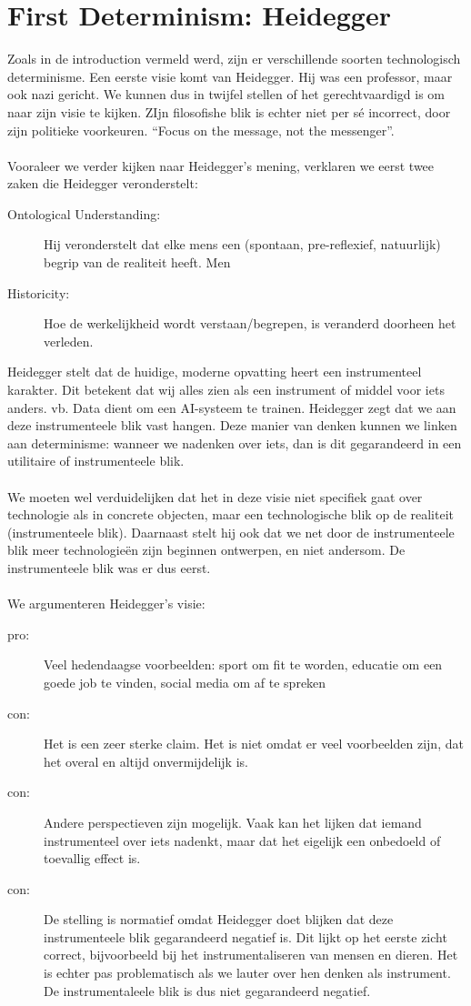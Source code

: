 \documentclass[../summary.tex]{subfiles}
\begin{document}
	\section{First Determinism: Heidegger}
	Zoals in de introduction vermeld werd, zijn er verschillende soorten technologisch determinisme. Een eerste visie komt van Heidegger. Hij was een professor, maar ook nazi gericht. We kunnen dus in twijfel stellen of het gerechtvaardigd is om naar zijn visie te kijken. ZIjn filosofishe blik is echter niet per sé incorrect, door zijn politieke voorkeuren. ``Focus on the message, not the messenger''. \\
	\\
	Vooraleer we verder kijken naar Heidegger's mening, verklaren we eerst twee zaken die Heidegger veronderstelt:
	\begin{description}
		\item[Ontological Understanding: ] Hij veronderstelt dat elke mens een (spontaan, pre-reflexief, natuurlijk) begrip van de realiteit heeft. Men
		\item[Historicity: ] Hoe de werkelijkheid wordt verstaan/begrepen, is veranderd doorheen het verleden.
	\end{description}
	Heidegger stelt dat de huidige, moderne opvatting heert een instrumenteel karakter. Dit betekent dat wij alles zien als een instrument of middel voor iets anders. vb. Data dient om een AI-systeem te trainen. Heidegger zegt dat we aan deze instrumenteele blik vast hangen. Deze manier van denken kunnen we linken aan determinisme: wanneer we nadenken over iets, dan is dit gegarandeerd in een utilitaire of instrumenteele blik.\\
	\\
	We moeten wel verduidelijken dat het in deze visie niet specifiek gaat over technologie als in concrete objecten, maar een technologische blik op de realiteit (instrumenteele blik). Daarnaast stelt hij ook dat we net door de instrumenteele blik meer technologieën zijn beginnen ontwerpen, en niet andersom. De instrumenteele blik was er dus eerst. \\
	\\
	We argumenteren Heidegger's visie:
	\begin{description}
		\item[pro:] Veel hedendaagse voorbeelden: sport om fit te worden, educatie om een goede job te vinden, social media om af te spreken
		\item[con:] Het is een zeer sterke claim. Het is niet omdat er veel voorbeelden zijn, dat het overal en altijd onvermijdelijk is.
		\item[con:] Andere perspectieven zijn mogelijk. Vaak kan het lijken dat iemand instrumenteel over iets nadenkt, maar dat het eigelijk een onbedoeld of toevallig effect is.
		\item[con:] De stelling is normatief omdat Heidegger doet blijken dat deze instrumenteele blik gegarandeerd negatief is. Dit lijkt op het eerste zicht correct, bijvoorbeeld bij het instrumentaliseren van mensen en dieren. Het is echter pas problematisch als we lauter over hen denken als instrument. De instrumentaleele blik is dus niet gegarandeerd negatief.
	\end{description}
	
\end{document}
